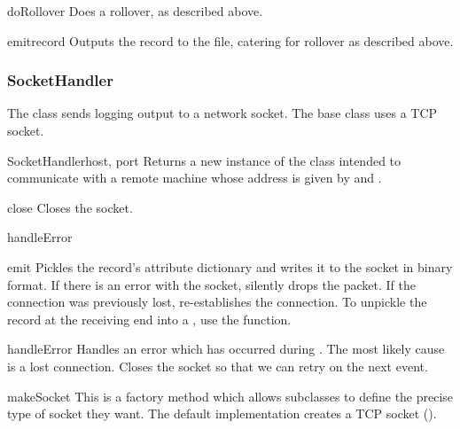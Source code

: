 \begin{methoddesc}{doRollover}{}
Does a rollover, as described above.
\end{methoddesc}

\begin{methoddesc}{emit}{record}
Outputs the record to the file, catering for rollover as described
above.
\end{methoddesc}

\subsubsection{SocketHandler}

The  class sends logging output to a network
socket. The base class uses a TCP socket.

\begin{classdesc}{SocketHandler}{host, port}
Returns a new instance of the  class intended to
communicate with a remote machine whose address is given by 
and .
\end{classdesc}

\begin{methoddesc}{close}{}
Closes the socket.
\end{methoddesc}

\begin{methoddesc}{handleError}{}
\end{methoddesc}

\begin{methoddesc}{emit}{}
Pickles the record's attribute dictionary and writes it to the socket in
binary format. If there is an error with the socket, silently drops the
packet. If the connection was previously lost, re-establishes the connection.
To unpickle the record at the receiving end into a , use the
 function.
\end{methoddesc}

\begin{methoddesc}{handleError}{}
Handles an error which has occurred during . The
most likely cause is a lost connection. Closes the socket so that
we can retry on the next event.
\end{methoddesc}

\begin{methoddesc}{makeSocket}{}
This is a factory method which allows subclasses to define the precise
type of socket they want. The default implementation creates a TCP
socket ().
\end{methoddesc}

